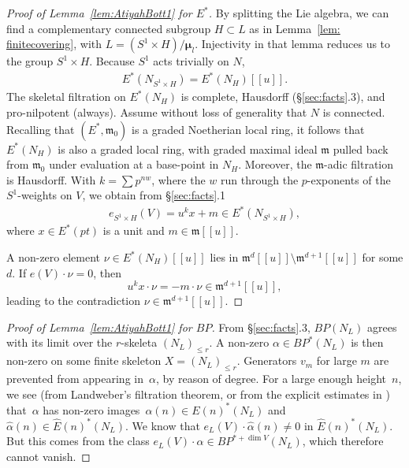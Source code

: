 \documentclass[11pt, reqno]{amsart}
\theoremstyle{plain}
\theoremstyle{definition}
\newcommand{\En}{\widehat{E}(n)}
\begin{document}
\begin{proof}[Proof of Lemma~\ref{lem:AtiyahBott1} for $E^*$]
By splitting the Lie algebra, we can find a complementary connected subgroup $H \subset L$ as in 
Lemma~\ref{lem: finitecovering}, with $L= (S^1\times H)/\boldsymbol{\mu}_l$. Injectivity in that 
lemma reduces us to the group $S^1 \times H$.  Because $S^1$ acts trivially on $N$,  
\begin{align} 
E^*(N_{S^1 \times H})= E^*(N_H)[[u]]. 
\end{align} 
The skeletal filtration on $E^*(N_H)$ is complete, Hausdorff (\S\ref{sec:facts}.3), and pro-nilpotent 
(always). Assume without loss of generality that $N$ is connected. Recalling that $(E^*,\mathfrak{m}_0)$ 
is a graded Noetherian local ring, it follows that $E^*(N_H)$ is also a graded local ring, with 
graded maximal ideal $\mathfrak{m}$ pulled back from 
$\mathfrak{m}_0$ under evaluation at a 
base-point in $N_H$. Moreover, the $\mathfrak{m}$-adic filtration is Hausdorff.  
With $k = \sum p^{nw}$, where the $w$ run through the $p$-exponents of the $S^1$-weights 
on $V$, we obtain from \S\ref{sec:facts}.1  
\begin{align} \label{eq:restrictioneuler} 
e_{S^1\times H}(V)= u^kx + m \in E^*(N_{S^1 \times H}),  
\end{align}  
where $x \in E^*(pt)$ is a unit and $m\in \mathfrak{m}[[u]]$.  

A non-zero element $\nu \in E^*(N_{H})[[u]]$  lies in $\mathfrak{m}^d[[u]] \setminus \mathfrak{m}^{d+1}[[u]]$ 
for some $d$. If $e(V)\cdot \nu = 0$, then
\[
u^kx\cdot \nu = -m\cdot\nu \in \mathfrak{m}^{d+1}[[u]],
\]
leading to the contradiction $\nu\in \mathfrak{m}^{d+1}[[u]]$. 
\end{proof}



\begin{proof}[Proof of Lemma~\ref{lem:AtiyahBott1} for $BP$] 
From \S\ref{sec:facts}.3, $BP(N_L)$ agrees with its limit over the $r$-skeleta $(N_L)_{\le r}$. A 
non-zero $\alpha\in BP^*(N_L)$ is then non-zero on some finite skeleton $X=(N_L)_{\le r}$. 
Generators $v_m$ for large $m$ are prevented from appearing 
in~$\alpha$, by reason of degree. For a large enough height~$n$, we see (from Landweber's 
filtration theorem, or from the explicit estimates in \cite{jw2}) that~$\alpha$ has non-zero 
images~$\alpha(n)\in E(n)^*(N_L)$ and $\widehat{\alpha}(n)\in \En^*(N_L)$. We know that 
$e_L(V)\cdot\widehat{\alpha}(n)\neq 0$ in $\En^*(N_L)$. But this comes from the class 
$e_L(V)\cdot\alpha\in BP^{*+\dim V}(N_L)$, which therefore cannot vanish. 
\end{proof} 
\end{document}
